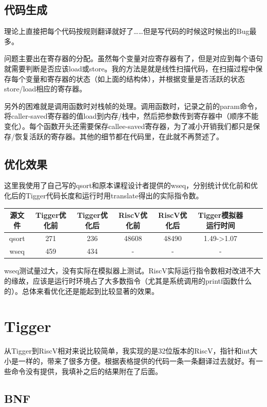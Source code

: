 \documentclass{ctexart}
\begin{document}
\subsection{代码生成}
理论上直接把每个代码按规则翻译就好了……但是写代码的时候这时候出的Bug最多。

问题主要出在寄存器的分配。虽然每个变量对应寄存器有了，但是对应到每个语句就需要判断是否应该load或store。我的方法是就是线性扫描代码，在扫描过程中保存每个变量和寄存器的状态（如上面的结构体），并根据变量是否活跃的状态store/load相应的寄存器。

另外的困难就是调用函数时对栈帧的处理。调用函数时，记录之前的param命令，将caller-saved寄存器的值load到内存/栈中，然后把参数传到寄存器中（顺序不能变化）。每个函数开头还需要保存callee-saved寄存器，为了减小开销我们都只是保存/恢复活跃的寄存器。其他的细节都在代码里，在此就不再赘述了。

\subsection{优化效果}
这里我使用了自己写的qsort和原本课程设计者提供的wseq，分别统计优化前和优化后的Tigger代码长度和运行时用translate得出的实际指令数。

\begin{center}
  \begin{tabular}{cccccccc}
  \hline
  源文件& Tigger优化前& Tigger优化后& RiscV优化前& RiscV优化后& Tigger模拟器运行时间\\
  \hline
  qsort& 271& 236& 48608& 48490& 1.49->1.07\\
  wseq& 459& 434& -& -& -\\
  \hline
  \end{tabular}
\end{center}


wseq测试量过大，没有实际在模拟器上测试。RiscV实际运行指令数相对改进不大的缘故，应该是运行时环境占了大多数指令（尤其是系统调用的printf函数什么的）。总体来看优化还是能起到比较显著的效果。
\section{Tigger}

从Tigger到RiscV相对来说比较简单，我实现的是32位版本的RiscV，指针和int大小是一样的，带来了很多方便。根据表格提供的代码一条一条翻译过去就好。有一些命令没有提供，我填补之后的结果附在了后面。

\newpage
\subsection{BNF}
\end{document}
